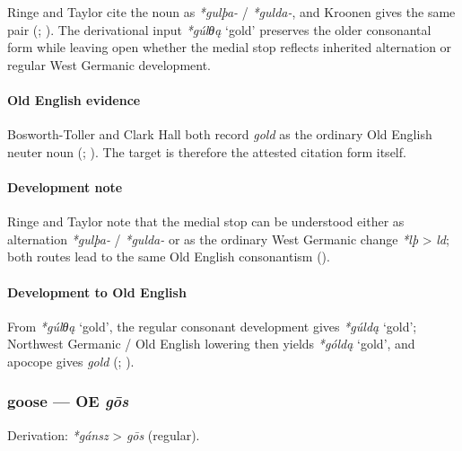 \documentclass[
  british,
  a4paper,
]{article}
\providecommand{\Recon}[1]{\emph{*#1}}
\begin{document}
Ringe and Taylor cite the noun as \emph{*gulþa-} / \emph{*gulda-}, and
Kroonen gives the same pair (; ). The
derivational input \Recon{gúlθą} `gold' preserves the older consonantal
form while leaving open whether the medial stop reflects inherited
alternation or regular West Germanic development.

\paragraph{Old English evidence}\label{old-english-evidence-28}

Bosworth-Toller and Clark Hall both record \emph{gold} as the ordinary
Old English neuter noun (; ).
The target is therefore the attested citation form itself.

\paragraph{Development note}\label{development-note-1}

Ringe and Taylor note that the medial stop can be understood either as
alternation \emph{*gulþa-} / \emph{*gulda-} or as the ordinary West
Germanic change \emph{*lþ} \textgreater{} \emph{ld}; both routes lead to
the same Old English consonantism ().

\paragraph{Development to Old
English}\label{development-to-old-english-28}

From \Recon{gúlθą} `gold', the regular consonant development gives
\Recon{gúldą} `gold'; Northwest Germanic / Old English lowering then
yields \Recon{góldą} `gold', and apocope gives \emph{gold}
(;
).

\subsubsection{\texorpdfstring{goose --- OE
\emph{gōs}}{goose --- OE gōs}}\label{goose-oe-gux14ds}

Derivation: \emph{*gánsz} \textgreater{} \emph{gōs} (regular).
\end{document}
